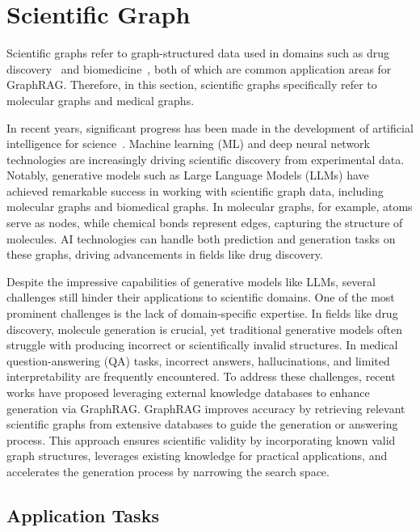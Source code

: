 \section{Scientific Graph \texorpdfstring{\emojiscititle}{Scientific Graph}}
\label{sec-sci}
Scientific graphs refer to graph-structured data used in domains such as drug discovery~\cite{wangretrieval,huanginteraction,liu2024moleculargpt} and biomedicine~\cite{yang2024kg, liu2024drak,delile2024graph,jiang2024hykge,byambasuren2019preliminary,wen2023mindmap}, both of which are common application areas for GraphRAG. Therefore, in this section, scientific graphs specifically refer to molecular graphs and medical graphs.

In recent years, significant progress has been made in the development of artificial intelligence for science~\cite{abramson2024accurate,jumper2021highly,thirunavukarasu2023large,madani2023large}. Machine learning (ML) and deep neural network technologies are increasingly driving scientific discovery from experimental data. Notably, generative models such as Large Language Models (LLMs) have achieved remarkable success in working with scientific graph data, including molecular graphs and biomedical graphs. In molecular graphs, for example, atoms serve as nodes, while chemical bonds represent edges, capturing the structure of molecules. AI technologies can handle both prediction and generation tasks on these graphs, driving advancements in fields like drug discovery.

Despite the impressive capabilities of generative models like LLMs, several challenges still hinder their applications to scientific domains. One of the most prominent challenges is the lack of domain-specific expertise. In fields like drug discovery, molecule generation is crucial, yet traditional generative models often struggle with producing incorrect or scientifically invalid structures. In medical question-answering (QA) tasks, incorrect answers, hallucinations, and limited interpretability are frequently encountered. To address these challenges, recent works have proposed leveraging external knowledge databases to enhance generation via GraphRAG. GraphRAG improves accuracy by retrieving relevant scientific graphs from extensive databases to guide the generation or answering process. This approach ensures scientific validity by incorporating known valid graph structures, leverages existing knowledge for practical applications, and accelerates the generation process by narrowing the search space.

\subsection{Application Tasks}

